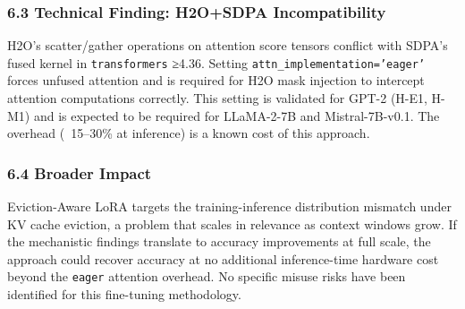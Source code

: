 \subsubsection{6.3 Technical Finding: H2O+SDPA Incompatibility}

H2O's scatter/gather operations on attention score tensors conflict with SDPA's fused kernel in \texttt{transformers} ≥4.36. Setting \texttt{attn_implementation='eager'} forces unfused attention and is required for H2O mask injection to intercept attention computations correctly. This setting is validated for GPT-2 (H-E1, H-M1) and is expected to be required for LLaMA-2-7B and Mistral-7B-v0.1. The overhead (~15–30\% at inference) is a known cost of this approach.

\subsubsection{6.4 Broader Impact}

Eviction-Aware LoRA targets the training-inference distribution mismatch under KV cache eviction, a problem that scales in relevance as context windows grow. If the mechanistic findings translate to accuracy improvements at full scale, the approach could recover accuracy at no additional inference-time hardware cost beyond the \texttt{eager} attention overhead. No specific misuse risks have been identified for this fine-tuning methodology.

